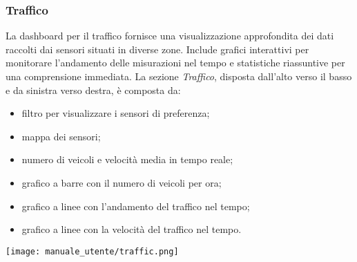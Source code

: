 \newpage
\subsubsection{Traffico}
La dashboard per il traffico fornisce una visualizzazione approfondita dei dati raccolti dai sensori situati in diverse zone. Include grafici interattivi per monitorare l'andamento delle misurazioni nel tempo e statistiche riassuntive per una comprensione immediata. La sezione \textit{Traffico}, disposta dall'alto verso il basso e da sinistra verso destra, è composta da:
\begin{itemize}
    \item filtro per visualizzare i sensori di preferenza;
    \item mappa dei sensori;
    \item numero di veicoli e velocità media in tempo reale;
    \item grafico a barre con il numero di veicoli per ora;
    \item grafico a linee con l'andamento del traffico nel tempo;
    \item grafico a linee con la velocità del traffico nel tempo.
\end{itemize}
\begin{center}
    \texttt{[image: manuale\_utente/traffic.png]}
\end{center}



